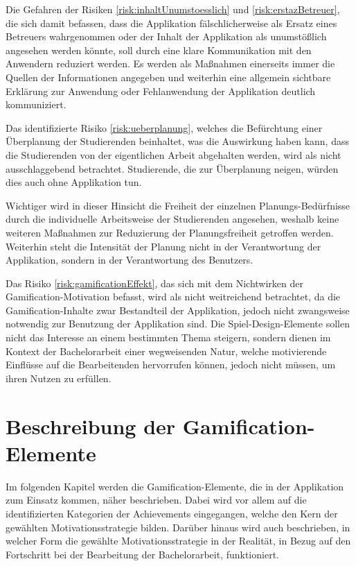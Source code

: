 \documentclass[bibliography=totoc,listof=totoc,BCOR=5mm,DIV=12,oneside]{scrbook}
\begin{document}
\par \medskip Die Gefahren der Risiken \ref{risk:inhaltUnumstoesslich} und \ref{risk:erstazBetreuer}, die sich damit befassen, dass die Applikation fälschlicherweise als Ersatz eines Betreuers wahrgenommen oder der Inhalt der Applikation als unumstößlich angesehen werden könnte, soll durch eine klare Kommunikation mit den Anwendern reduziert werden. Es werden als Maßnahmen einerseits immer die Quellen der Informationen angegeben und weiterhin eine allgemein sichtbare Erklärung zur Anwendung oder Fehlanwendung der Applikation deutlich kommuniziert.

\par \medskip  Das identifizierte Risiko \ref{risk:ueberplanung}, welches die Befürchtung einer Überplanung der Studierenden beinhaltet, was die Auswirkung haben kann, dass die Studierenden von der eigentlichen Arbeit abgehalten werden, wird als nicht ausschlaggebend betrachtet.
Studierende, die zur Überplanung neigen, würden dies auch ohne Applikation tun. 
\par Wichtiger wird in dieser Hinsicht die Freiheit der einzelnen Planungs-Bedürfnisse durch die individuelle Arbeitsweise der Studierenden angesehen, weshalb keine weiteren Maßnahmen zur Reduzierung der Planungsfreiheit getroffen werden. Weiterhin steht die Intensität der Planung nicht in der Verantwortung der Applikation, sondern in der Verantwortung des Benutzers. 

\par \medskip Das Risiko \ref{risk:gamificationEffekt}, das sich mit dem Nichtwirken der Gamification-Motivation befasst, wird als nicht weitreichend betrachtet, da die Gamification-Inhalte zwar Bestandteil der Applikation, jedoch nicht zwangsweise notwendig zur Benutzung der Applikation sind. Die Spiel-Design-Elemente sollen nicht das Interesse an einem bestimmten Thema steigern, sondern dienen im Kontext der Bachelorarbeit einer wegweisenden Natur, welche motivierende Einflüsse auf die Bearbeitenden hervorrufen können, jedoch nicht müssen, um ihren Nutzen zu erfüllen. 

\newpage
\section{Beschreibung der Gamification-Elemente} \label{sec:gamificationelemente}
\par Im folgenden Kapitel werden die Gamification-Elemente, die in der Applikation zum Einsatz kommen, näher beschrieben. Dabei wird vor allem auf die identifizierten Kategorien der Achievements eingegangen, welche den Kern der gewählten Motivationsstrategie bilden. Darüber hinaus wird auch beschrieben, in welcher Form die gewählte Motivationsstrategie in der Realität, in Bezug auf den Fortschritt bei der Bearbeitung der Bachelorarbeit, funktioniert.
\end{document}
